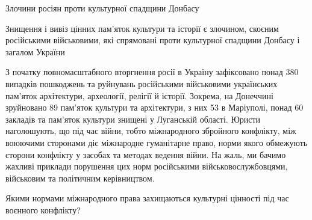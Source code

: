  
 
 
 
 

Злочини росіян проти культурної спадщини Донбасу

Знищення і вивіз цінних пам'яток культури та історії є злочином, скоєним
російськими військовими, які спрямовані проти культурної спадщини Донбасу і
загалом України

З початку повномасштабного вторгнення росії в Україну зафіксовано понад 380
випадків пошкоджень та руйнувань російськими військовими українських пам'яток
архітектури, археології, релігії й історії. Зокрема, на Донеччині зруйновано 89
пам'яток культури та архітектури, з них 53 в Маріуполі, понад 60 закладів та
пам'яток культури знищені у Луганській області. Юристи наголошують, що під час
війни, тобто міжнародного збройного конфлікту, між воюючими сторонами діє
міжнародне гуманітарне право, норми якого обмежують сторони конфлікту у засобах
та методах ведення війни. На жаль, ми бачимо жахливі приклади порушення цих
норм російськими військовослужбовцями, військовим та політичним керівництвом.

Якими нормами міжнародного права захищаються культурні цінності під час
воєнного конфлікту?

